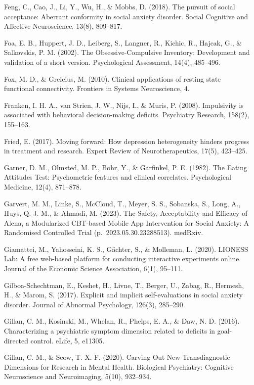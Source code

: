 \documentclass[12pt,a4paper,oneside,]{book} %
\begin{document}
Feng, C., Cao, J., Li, Y., Wu, H., \& Mobbs, D. (2018). The pursuit of social acceptance: Aberrant conformity in social anxiety disorder. Social Cognitive and Affective Neuroscience, 13(8), 809--817.

Foa, E. B., Huppert, J. D., Leiberg, S., Langner, R., Kichic, R., Hajcak, G., \& Salkovskis, P. M. (2002). The Obsessive-Compulsive Inventory: Development and validation of a short version. Psychological Assessment, 14(4), 485--496.

Fox, M. D., \& Greicius, M. (2010). Clinical applications of resting state functional connectivity. Frontiers in Systems Neuroscience, 4.

Franken, I. H. A., van Strien, J. W., Nijs, I., \& Muris, P. (2008). Impulsivity is associated with behavioral decision-making deficits. Psychiatry Research, 158(2), 155--163.

Fried, E. (2017). Moving forward: How depression heterogeneity hinders progress in treatment and research. Expert Review of Neurotherapeutics, 17(5), 423--425.

Garner, D. M., Olmsted, M. P., Bohr, Y., \& Garfinkel, P. E. (1982). The Eating Attitudes Test: Psychometric features and clinical correlates. Psychological Medicine, 12(4), 871--878.

Garvert, M. M., Linke, S., McCloud, T., Meyer, S. S., Sobanska, S., Long, A., Huys, Q. J. M., \& Ahmadi, M. (2023). The Safety, Acceptability and Efficacy of Alena, a Modularized CBT-based Mobile App Intervention for Social Anxiety: A Randomised Controlled Trial (p.~2023.05.30.23288513). medRxiv.

Giamattei, M., Yahosseini, K. S., Gächter, S., \& Molleman, L. (2020). LIONESS Lab: A free web-based platform for conducting interactive experiments online. Journal of the Economic Science Association, 6(1), 95--111.

Gilboa-Schechtman, E., Keshet, H., Livne, T., Berger, U., Zabag, R., Hermesh, H., \& Marom, S. (2017). Explicit and implicit self-evaluations in social anxiety disorder. Journal of Abnormal Psychology, 126(3), 285--290.

Gillan, C. M., Kosinski, M., Whelan, R., Phelps, E. A., \& Daw, N. D. (2016). Characterizing a psychiatric symptom dimension related to deficits in goal-directed control. eLife, 5, e11305.

Gillan, C. M., \& Seow, T. X. F. (2020). Carving Out New Transdiagnostic Dimensions for Research in Mental Health. Biological Psychiatry: Cognitive Neuroscience and Neuroimaging, 5(10), 932--934.
\end{document}
